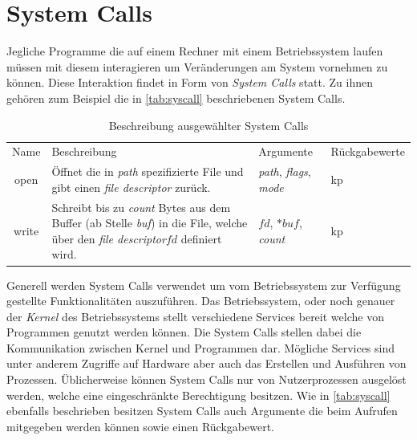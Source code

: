     \section{System Calls}\label{sec:syscalls}
        Jegliche Programme die auf einem Rechner mit einem Betriebssystem laufen müssen mit diesem interagieren um Veränderungen am System vornehmen zu können.
        Diese Interaktion findet in Form von \textit{System Calls}  statt.
        Zu ihnen gehören zum Beispiel die in \autoref{tab:syscall} beschriebenen System Calls.

        \begin{table}[h]
            \small
            \label{tab:syscall}
            \centering
            \begin{tabular}{c||p{6cm}|p{3cm}|p{3cm}}
                \hline
                \rowcolor{Gray!36}
                \multicolumn{4}{c}{System Calls}\\
                \hline
                Name & Beschreibung & Argumente & Rückgabewerte\\
                \hline
                \hline
                \rowcolor{Gray!16}
                open& Öffnet die in \textit{path} spezifizierte File und gibt einen \textit{file descriptor} zurück.& \textit{path}, \textit{flags}, \textit{mode} & kp\\
                write& Schreibt bis zu \textit{count} Bytes aus dem Buffer (ab Stelle \textit{buf}) in die File, welche über den \textit{file descriptor}$fd$ definiert wird. & $fd$, $*buf$, \textit{count} & kp\\
                \hline
            \end{tabular}
            \caption{Beschreibung ausgewählter System Calls}
        \end{table}

        Generell werden System Calls verwendet um vom Betriebssystem zur Verfügung gestellte Funktionalitäten auszuführen.
        Das Betriebssystem, oder noch genauer der \textit{Kernel}  des Betriebssystems stellt verschiedene Services bereit welche von Programmen genutzt werden können. 
        Die System Calls stellen dabei die Kommunikation zwischen Kernel und Programmen dar.
        Mögliche Services sind unter anderem Zugriffe auf Hardware aber auch das Erstellen und Ausführen von Prozessen.
        Üblicherweise können System Calls nur von Nutzerprozessen ausgelöst werden, welche eine eingeschränkte Berechtigung besitzen.
        Wie in \autoref{tab:syscall} ebenfalls beschrieben besitzen System Calls auch Argumente die beim Aufrufen mitgegeben werden können sowie einen Rückgabewert.


